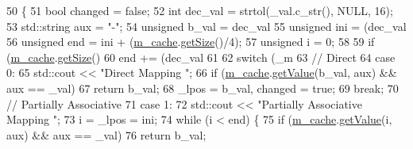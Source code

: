 \begin{DoxyCode}
50                                                                                    \{
51     \textcolor{keywordtype}{bool} changed    = \textcolor{keyword}{false};
52     \textcolor{keywordtype}{int} dec\_val     = strtol(\_val.c\_str(), NULL, 16);
53     std::string aux = \textcolor{stringliteral}{"-"};
54     \textcolor{keywordtype}{unsigned} b\_val  = dec\_val %
55     \textcolor{keywordtype}{unsigned} ini    = (dec\_val %
56     \textcolor{keywordtype}{unsigned} end    = ini + (\hyperlink{classMappingSimulator_a5a8a438a167ea70c9aee70635d0ae06a}{m\_cache}.\hyperlink{classCache_aeba1d1861c728efecdf8774de51c77d0}{getSize}()/4);
57     \textcolor{keywordtype}{unsigned} i      = 0;
58 
59     \textcolor{keywordflow}{if} (\hyperlink{classMappingSimulator_a5a8a438a167ea70c9aee70635d0ae06a}{m\_cache}.\hyperlink{classCache_aeba1d1861c728efecdf8774de51c77d0}{getSize}() %
60         end += (dec\_val %
61 
62     \textcolor{keywordflow}{switch} (\_m %
63         \textcolor{comment}{// Direct}
64         \textcolor{keywordflow}{case} 0:
65             std::cout << \textcolor{stringliteral}{"Direct Mapping "};
66             \textcolor{keywordflow}{if} (\hyperlink{classMappingSimulator_a5a8a438a167ea70c9aee70635d0ae06a}{m\_cache}.\hyperlink{classCache_a6cae76d581d7c6c655652ed8c7a5afca}{getValue}(b\_val, aux) && aux == \_val)
67                 \textcolor{keywordflow}{return} b\_val;
68             \_lpos = b\_val, changed = \textcolor{keyword}{true};
69             \textcolor{keywordflow}{break};
70         \textcolor{comment}{// Partially Associative}
71         \textcolor{keywordflow}{case} 1:
72             std::cout << \textcolor{stringliteral}{"Partially Associative Mapping "};
73             i = \_lpos = ini;
74             \textcolor{keywordflow}{while} (i < end) \{
75                 \textcolor{keywordflow}{if} (\hyperlink{classMappingSimulator_a5a8a438a167ea70c9aee70635d0ae06a}{m\_cache}.\hyperlink{classCache_a6cae76d581d7c6c655652ed8c7a5afca}{getValue}(i, aux) && aux == \_val)
76                     \textcolor{keywordflow}{return} b\_val;

\end{DoxyCode}

